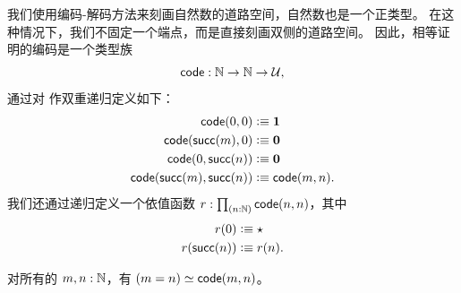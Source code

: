 %
%
我们使用编码-解码方法来刻画自然数的道路空间，自然数也是一个正类型。
在这种情况下，我们不固定一个端点，而是直接刻画双侧的道路空间。
因此，相等证明的编码是一个类型族
\[\mathsf{code}:\mathbb{N}\to\mathbb{N}\to\mathcal{U},\]
通过对 \N 作双重递归定义如下：
\begin{align*}
  \mathsf{code}(0,0) &\vcentcolon\equiv \mathbf{1}\\
  \mathsf{code}(\mathsf{succ}(m),0) &\vcentcolon\equiv \mathbf{0}\\
  \mathsf{code}(0,\mathsf{succ}(n)) &\vcentcolon\equiv \mathbf{0}\\
  \mathsf{code}(\mathsf{succ}(m),\mathsf{succ}(n)) &\vcentcolon\equiv \mathsf{code}(m,n).
\end{align*}
我们还通过递归定义一个依值函数 $r:\prd{n:\N} \code(n,n)$，其中
\begin{align*}
  r(0) &\vcentcolon\equiv \star\\
  r(\mathsf{succ}(n)) &\vcentcolon\equiv r(n).
\end{align*}

\begin{thm}\label{thm:path-nat}
  对所有的 $m,n:\mathbb{N}$，有 $(m=n) \simeq \mathsf{code}(m,n)$。
\end{thm}

